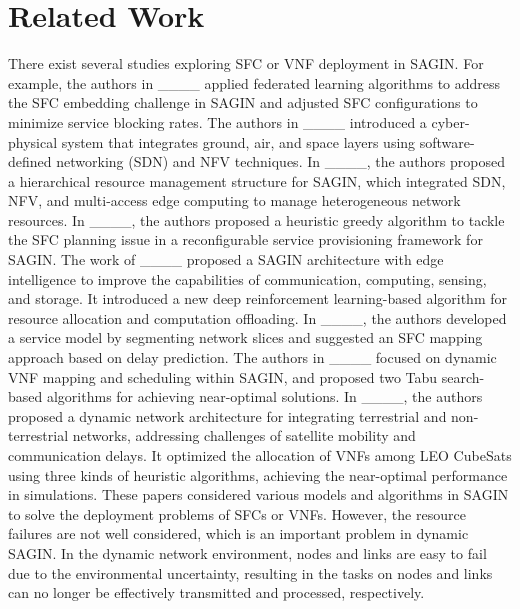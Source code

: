 \section{Related Work\label{sec:Related-Work}
}



There exist several studies exploring SFC or VNF deployment in SAGIN. For example, the authors in ____ applied federated learning algorithms to address the SFC embedding challenge in SAGIN and adjusted SFC configurations to minimize service blocking rates. The authors in ____ introduced a cyber-physical system that integrates ground, air, and space layers using software-defined networking (SDN) and NFV techniques. In ____, the authors proposed a hierarchical resource management structure for SAGIN, which integrated SDN, NFV, and multi-access edge computing to manage heterogeneous network resources. In ____, the authors proposed a heuristic greedy algorithm to tackle the SFC planning issue in a reconfigurable service provisioning framework for SAGIN. The work of ____ proposed a SAGIN architecture with edge intelligence to improve the capabilities of communication, computing, sensing, and storage. It introduced a new deep reinforcement learning-based algorithm for resource allocation and computation offloading. In ____, the authors developed a service model by segmenting network slices and suggested an SFC mapping approach based on delay prediction. The authors in ____ focused on dynamic VNF mapping and scheduling within SAGIN, and proposed two Tabu search-based algorithms for achieving near-optimal solutions. In ____, the authors proposed a dynamic network architecture for integrating terrestrial and non-terrestrial networks, addressing challenges of satellite mobility and communication delays. It optimized the allocation of VNFs among LEO CubeSats using three kinds of heuristic algorithms, achieving the near-optimal performance in simulations. These papers considered various models and algorithms in SAGIN to solve the deployment problems of SFCs or VNFs. However, the resource failures are not well considered, which is an important problem in dynamic SAGIN. In the dynamic network environment, nodes and links are easy to fail due to the environmental uncertainty, resulting in the tasks on nodes and links can no longer be effectively transmitted and processed, respectively.

